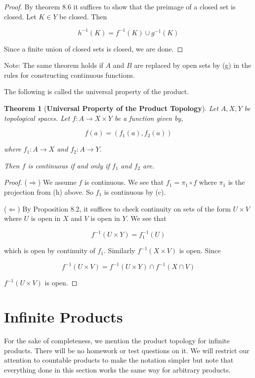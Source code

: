 \documentclass[a4paper]{article}
\newtheorem{theorem}{Theorem}
\numberwithin{theorem}{section}
\begin{document}
\begin{proof}
By theorem 8.6 it suffices to show that the preimage of a closed set is closed. Let $K \in Y$ be closed. Then

$$ h^{-1}(K) = f^{-1}(K) \cup g^{-1}(K) $$

Since a finite union of closed sets is closed, we are done.
\end{proof}

Note: The same theorem holds if $A$ and $B$ are replaced by open sets by (g) in the rules for constructing continuous functions.

The following is called the universal property of the product. 

\begin{theorem}[\textbf{Universal Property of the Product Topology}]
Let $A,X,Y$ be topological spaces. Let $f: A \rightarrow X \times Y$ be a function given by,

$$ f(a) = (f_1(a),f_2(a)) $$

where $f_1 : A \rightarrow X$ and $f_2 : A \rightarrow Y$.

Then $f$ is continuous if and only if $f_1$ and $f_2$ are.
 
\end{theorem}

\begin{proof}
($\Rightarrow$) We assume $f$ is continuous. We see that $f_1 = \pi_1 \circ f$ where $\pi_1$ is the projection from (h) above. So $f_1$ is continuous by (c).

($\Leftarrow$) By Proposition 8.2, it suffices to check continuity on sets of the form $U \times V$ where $U$ is open in $X$ and $V$ is open in $Y$. We see that 

$$ f^{-1}(U \times Y) = f_1^{-1}(U) $$

which is open by continuity of $f_1$. Similarly $f^{-1}(X \times V)$ is open. Since 

$$ f^{-1}(U \times V) = f^{-1}(U \times Y) \cap f^{-1}(X \cap V) $$

$f^{-1}(U \times V)$ is open.

\end{proof}

\section{Infinite Products}

For the sake of completeness, we mention the product topology for infinite products. There will be no homework or test questions on it. We will restrict our attention to countable products to make the notation simpler but note that everything done in this section works the same way for arbitrary products.
\end{document}
